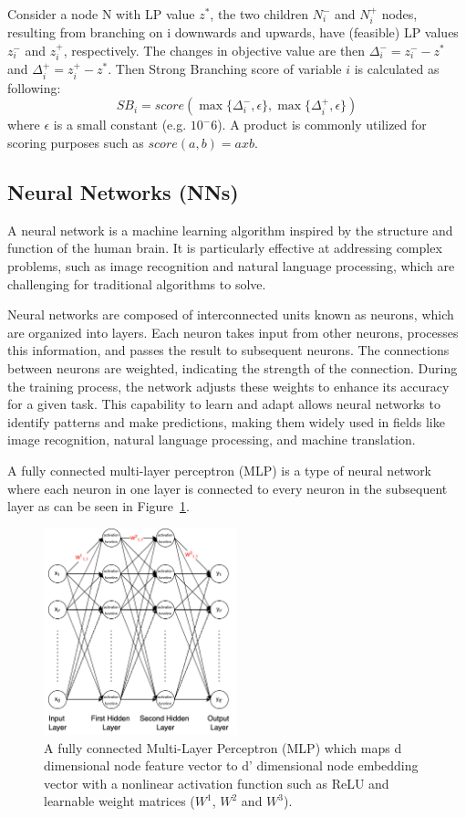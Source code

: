 Consider a node N with LP value $z^*$, the two children $N_i^-$ and $N_i^+$ nodes, resulting from branching on i downwards and upwards, have (feasible) LP values $z_i^-$ and $z_i^+$, respectively.
The changes in objective value are then $\Delta_i^- = z_i^- - z^* $  and $\Delta_i^+ = z_i^+ - z^* $.
Then Strong Branching score of variable $i$ is calculated as following: $$SB_i = score (\max \{\Delta_i^-, \epsilon\}, \max \{\Delta_i^+, \epsilon\}) $$
where $\epsilon$ is a small constant (e.g. $10^-6$). A product is commonly utilized for scoring purposes such as $score(a, b) = a x b$.


\subsection{Neural Networks (NNs)}\label{subsec:neural-networks-(nns)}
A neural network is a machine learning algorithm inspired by the structure and function of the human brain.
It is particularly effective at addressing complex problems, such as image recognition and natural language processing, which are challenging for traditional algorithms to solve.


Neural networks are composed of interconnected units known as neurons, which are organized into layers.
Each neuron takes input from other neurons, processes this information, and passes the result to subsequent neurons.
The connections between neurons are weighted, indicating the strength of the connection.
During the training process, the network adjusts these weights to enhance its accuracy for a given task.
This capability to learn and adapt allows neural networks to identify patterns and make predictions, making them widely used in fields like image recognition, natural language processing, and machine translation.


A fully connected multi-layer perceptron (MLP) is a type of neural network where each neuron in one layer is connected to every neuron in the subsequent layer as can be seen in Figure~\ref{fig:mlp}.

\begin{figure}[htb!]
    \centering
    \includegraphics[width=0.5\textwidth]{figures/MLP}
    \caption{A fully connected Multi-Layer Perceptron (MLP) which maps d dimensional node feature vector to d’ dimensional node embedding vector with a nonlinear activation function such as ReLU and learnable weight matrices ($W^1$, $W^2$ and $W^3$).}
    \label{fig:mlp}
\end{figure}


